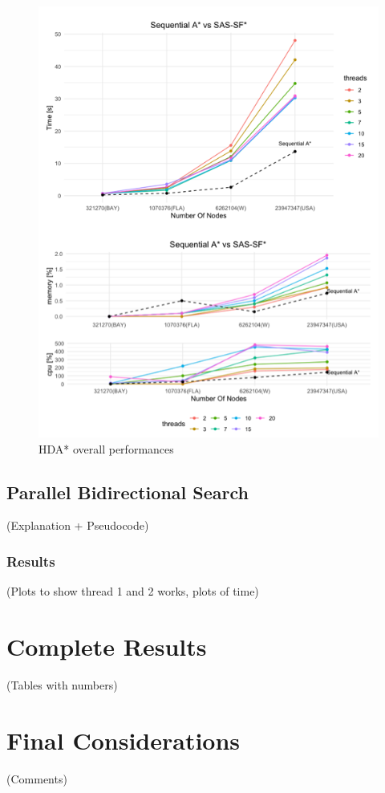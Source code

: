 \documentclass[twocolumn, switch]{article} %
\begin{document}
\begin{figure}[ht!]
  \centering
  \includegraphics[width=1\linewidth]{hda/tot.png}
  \caption{HDA* overall performances}
  \label{hdatot}
\end{figure}

\subsection{Parallel Bidirectional Search}
(Explanation + Pseudocode)
\subsubsection{Results}
(Plots to show thread 1 and 2 works, plots of time)

\section{Complete Results}
(Tables with numbers)

\section{Final Considerations}
(Comments)
\end{document}
